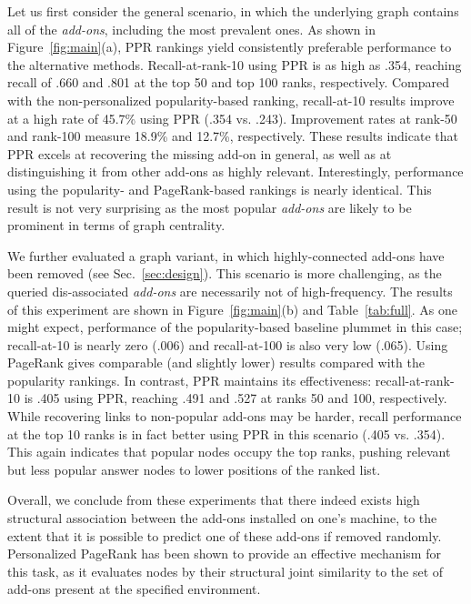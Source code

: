 \documentclass[11pt,oneside]{book}
\begin{document}
Let us first consider the general scenario, in which the underlying graph contains all of the {\it add-ons}, including the most prevalent ones. As shown in Figure~\ref{fig:main}(a), PPR rankings yield consistently preferable performance to the alternative methods. Recall-at-rank-10 using PPR is as high as .354, reaching recall of .660 and .801 at the top 50 and top 100 ranks, respectively. Compared with the non-personalized popularity-based ranking, recall-at-10 results improve at a high rate of 45.7\% using PPR (.354 vs. .243). Improvement rates at rank-50 and rank-100 measure 18.9\% and 12.7\%, respectively. These results indicate that PPR excels at recovering the missing add-on in general, as well as at distinguishing it from other add-ons as highly relevant. Interestingly, performance using the popularity- and PageRank-based rankings is nearly identical. This result is not very surprising as the most popular {\it add-ons} are likely to be prominent in terms of graph centrality. 

We further evaluated a graph variant, in which highly-connected add-ons have been removed (see Sec.~\ref{sec:design}). This scenario is more challenging, as the queried dis-associated {\it add-ons} are necessarily not of high-frequency. The results of this experiment are shown in Figure~\ref{fig:main}(b) and Table~\ref{tab:full}. As one might expect, performance of the popularity-based baseline plummet in this case; recall-at-10 is nearly zero (.006) and recall-at-100 is also very low (.065). Using PageRank gives comparable (and slightly lower) results compared with the popularity rankings. In contrast, PPR maintains its effectiveness: recall-at-rank-10 is .405 using PPR, reaching .491 and .527 at ranks 50 and 100, respectively. While recovering links to non-popular add-ons may be harder, recall performance at the top 10 ranks is in fact better using PPR in this scenario (.405 vs. .354). This again indicates that popular nodes occupy the top ranks, pushing relevant but less popular answer nodes to lower positions of the ranked list.  

Overall, we conclude from these experiments that there indeed exists high structural association between the add-ons installed on one's machine, to the extent that it is possible to predict one of these add-ons if removed randomly. Personalized PageRank has been shown to provide an effective mechanism for this task, as it evaluates nodes by their structural joint similarity to the set of add-ons present at the specified environment. 
\end{document}
